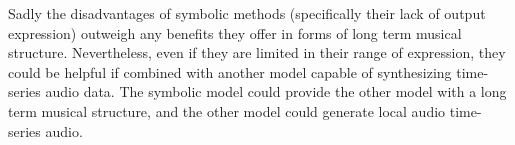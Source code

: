 Sadly the disadvantages of symbolic methods (specifically their lack of output expression) outweigh any benefits they offer in forms of long term musical structure. Nevertheless, even if they are limited in their range of expression, they could be helpful if combined with another model capable of synthesizing time-series audio data. The symbolic model could provide the other model with a long term musical structure, and the other model could generate local audio time-series audio.